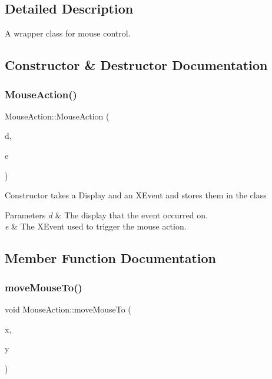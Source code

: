 \subsection{Detailed Description}
A wrapper class for mouse control. 

\subsection{Constructor \& Destructor Documentation}
\mbox{\label{classUbuntuController_1_1MouseAction_a42e540b994144f3f8775baded5370b14}} 
\subsubsection{\texorpdfstring{Mouse\+Action()}{MouseAction()}}
{\footnotesize\ttfamily Mouse\+Action\+::\+Mouse\+Action (\begin{DoxyParamCaption}\item[{Display $\ast$}]{d,  }\item[{X\+Event}]{e }\end{DoxyParamCaption})}

Constructor takes a Display and an X\+Event and stores them in the class


\begin{DoxyParams}{Parameters}
{\em d} & The display that the event occurred on. \\
\hline
{\em e} & The X\+Event used to trigger the mouse action. \\
\hline
\end{DoxyParams}


\subsection{Member Function Documentation}
\mbox{\label{classUbuntuController_1_1MouseAction_a7a14cab01ad2ccdb1b135d4bae939fe2}} 
\subsubsection{\texorpdfstring{move\+Mouse\+To()}{moveMouseTo()}}
{\footnotesize\ttfamily void Mouse\+Action\+::move\+Mouse\+To (\begin{DoxyParamCaption}\item[{int}]{x,  }\item[{int}]{y }\end{DoxyParamCaption})}

